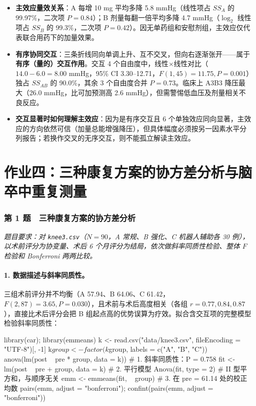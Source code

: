 \begin{itemize}
\item \textbf{主效应量效关系}：A 每增 10 mg 平均多降 5.8 mmHg（线性项占 $SS_A$ 的 99.97\%，二次项 $P=0.84$）；B 剂量每翻一倍平均多降 4.7 mmHg（$\log_2$ 线性项占 $SS_B$ 的 99.3\%，二次项 $P=0.42$）。因无单药组和安慰剂组，主效应仅代表联合用药下的加量效果。
\item \textbf{有序协同交互}：三条折线同向单调上升、互不交叉，但向右逐渐张开——属于\textbf{有序（量的）交互作用}。交互 4 个自由度中，线性$\times$线性对比（$14.0-6.0=8.00$ mmHg，95\% CI 3.30--12.71，$F(1,45)=11.75,P=0.001$）独占 $SS_{AB}$ 的 90.0\%，其余 3 个自由度合并 $P=0.73$。临床上 A3B3 降压最大（26.0 mmHg，比可加预测高 2.6 mmHg），但需警惕低血压及剂量相关不良反应。
\item \textbf{交互显著时如何理解主效应}：因为是有序交互且 6 个单独效应同向显著，主效应的方向依然可信（加量总能增强降压），但具体幅度必须按另一因素水平分列报告；若换作交叉的无序交互，则不能孤立解读主效应。
\end{itemize}

\section{作业四：三种康复方案的协方差分析与脑卒中重复测量}

\subsubsection*{第 1 题　三种康复方案的协方差分析}
\emph{题目要求：对 \texttt{knee3.csv}（$N=90$，A 常规、B 强化、C 机器人辅助各 30 例），以术前评分为协变量、术后 6 个月评分为结局，依次做斜率同质性检验、整体 $F$ 检验和 Bonferroni 两两比较。}

\paragraph{1. 数据描述与斜率同质性。}三组术前评分并不均衡（A 57.94、B 64.06、C 61.42，$F(2,87)=3.65,P=0.030$），且术前与术后高度相关（各组 $r=0.77,0.84,0.87$），直接比术后评分会把 B 组起点高的优势误算为疗效。拟合含交互项的完整模型检验斜率同质性：

\begin{rcode}
library(car); library(emmeans)
k <- read.csv("data/knee3.csv", fileEncoding = "UTF-8")[, -1]
k$group <- factor(k$group, labels = c("A", "B", "C"))
anova(lm(post ~ pre * group, data = k))          # 1. 斜率同质性：P = 0.758
fit <- lm(post ~ pre + group, data = k)          # 2. 平行模型
Anova(fit, type = 2)                             #    II 型平方和，与顺序无关
emm <- emmeans(fit, ~ group)                     # 3. 在 pre = 61.14 处的校正均数
pairs(emm, adjust = "bonferroni"); confint(pairs(emm, adjust = "bonferroni"))
\end{rcode}

